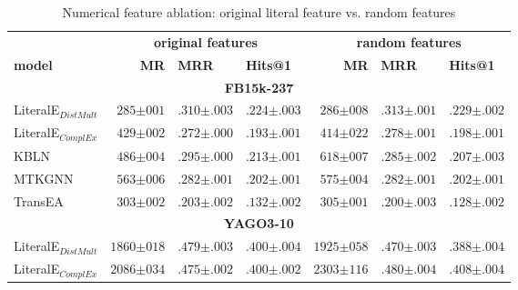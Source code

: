 
\begin{table}[]
\setlength{\tabcolsep}{6pt}
\renewcommand{\arraystretch}{1.1}

\caption{Numerical feature ablation: original literal feature vs. random features}
\label{tab:org_vs_rand}
\begin{center}
\begin{tabular}{l|rll|rll}

\hline
      & \multicolumn{3}{c|}{\textbf{original features}} & \multicolumn{3}{c}{\textbf{random features}} \\
\textbf{model}      & \textbf{MR} & \textbf{MRR} & \textbf{Hits@1} & \textbf{MR}  & \textbf{MRR} & \textbf{Hits@1} \\ \hline

\hline \multicolumn{7}{c}{\textbf{FB15k-237}} \\ \hline 
LiteralE$_{DistMult}$& $285{\scriptstyle \pm 001}$ & $.310{\scriptstyle \pm .003}$ & $.224{\scriptstyle \pm .003}$ & $286{\scriptstyle \pm 008}$ & $.313{\scriptstyle \pm .001}$ & $.229{\scriptstyle \pm .002}$  \\ 
LiteralE$_{ComplEx}$& $429{\scriptstyle \pm 002}$ & $.272{\scriptstyle \pm .000}$ & $.193{\scriptstyle \pm .001}$ & $414{\scriptstyle \pm 022}$ & $.278{\scriptstyle \pm .001}$ & $.198{\scriptstyle \pm .001}$  \\ 
KBLN& $486{\scriptstyle \pm 004}$ & $.295{\scriptstyle \pm .000}$ & $.213{\scriptstyle \pm .001}$ & $618{\scriptstyle \pm 007}$ & $.285{\scriptstyle \pm .002}$ & $.207{\scriptstyle \pm .003}$  \\ 
MTKGNN& $563{\scriptstyle \pm 006}$ & $.282{\scriptstyle \pm .001}$ & $.202{\scriptstyle \pm .001}$ & $575{\scriptstyle \pm 004}$ & $.282{\scriptstyle \pm .001}$ & $.202{\scriptstyle \pm .001}$  \\ 
TransEA& $303{\scriptstyle \pm 002}$ & $.203{\scriptstyle \pm .002}$ & $.132{\scriptstyle \pm .002}$ & $305{\scriptstyle \pm 001}$ & $.200{\scriptstyle \pm .003}$ & $.128{\scriptstyle \pm .002}$  \\ 
\hline \multicolumn{7}{c}{\textbf{YAGO3-10}} \\ \hline 
LiteralE$_{DistMult}$& $1860{\scriptstyle \pm 018}$ & $.479{\scriptstyle \pm .003}$ & $.400{\scriptstyle \pm .004}$ & $1925{\scriptstyle \pm 058}$ & $.470{\scriptstyle \pm .003}$ & $.388{\scriptstyle \pm .004}$  \\ 
LiteralE$_{ComplEx}$& $2086{\scriptstyle \pm 034}$ & $.475{\scriptstyle \pm .002}$ & $.400{\scriptstyle \pm .002}$ & $2303{\scriptstyle \pm 116}$ & $.480{\scriptstyle \pm .004}$ & $.408{\scriptstyle \pm .004}$  \\ 

\end{tabular}
\end{center}
\end{table}
